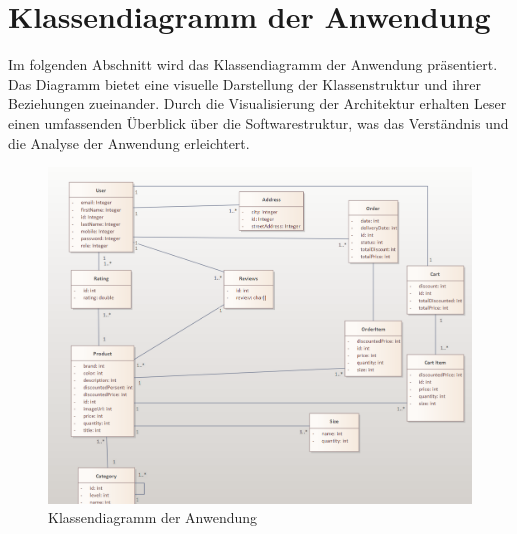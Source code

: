 \section{Klassendiagramm der Anwendung}
Im folgenden Abschnitt wird das Klassendiagramm der Anwendung präsentiert. Das Diagramm bietet eine visuelle Darstellung der Klassenstruktur und ihrer Beziehungen zueinander. Durch die Visualisierung der Architektur erhalten Leser einen umfassenden Überblick über die Softwarestruktur, was das Verständnis und die Analyse der Anwendung erleichtert.
\begin{figure}[H]
	\includegraphics[width=15cm]{klassenDiagram.png}
	\caption{Klassendiagramm der Anwendung }
	\label{fig:klsdiag}
\end{figure}

